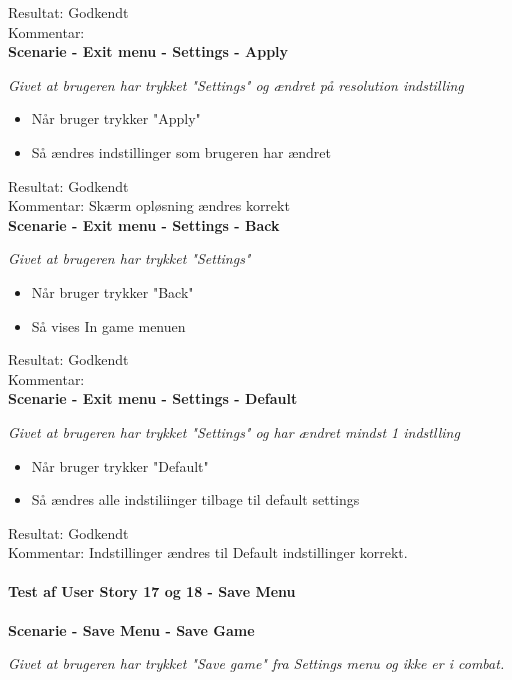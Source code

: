 Resultat: Godkendt\\
Kommentar:\\

\bf{Scenarie - Exit menu - Settings - Apply}

\it{Givet at brugeren har trykket "Settings" og ændret på resolution indstilling}

\begin{itemize}
  \item Når bruger trykker "Apply"
  \item Så ændres indstillinger som brugeren har ændret
\end{itemize}

Resultat: Godkendt\\
Kommentar: Skærm opløsning ændres korrekt\\

\bf{Scenarie - Exit menu - Settings - Back}

\it{Givet at brugeren har trykket "Settings"}

\begin{itemize}
  \item Når bruger trykker "Back"
  \item Så vises In game menuen
\end{itemize}

Resultat: Godkendt\\
Kommentar:\\

\bf{Scenarie - Exit menu - Settings - Default}

\it{Givet at brugeren har trykket "Settings" og har ændret mindst 1 indstlling}

\begin{itemize}
  \item Når bruger trykker "Default"
  \item Så ændres alle indstiliinger tilbage til default settings
\end{itemize}

Resultat: Godkendt\\
Kommentar: Indstillinger ændres til Default indstillinger korrekt.\\

\paragraph{Test af User Story 17 og 18 - Save Menu}

\bf{Scenarie - Save Menu - Save Game}

\it{Givet at brugeren har trykket "Save game" fra Settings menu og ikke er i combat.}

